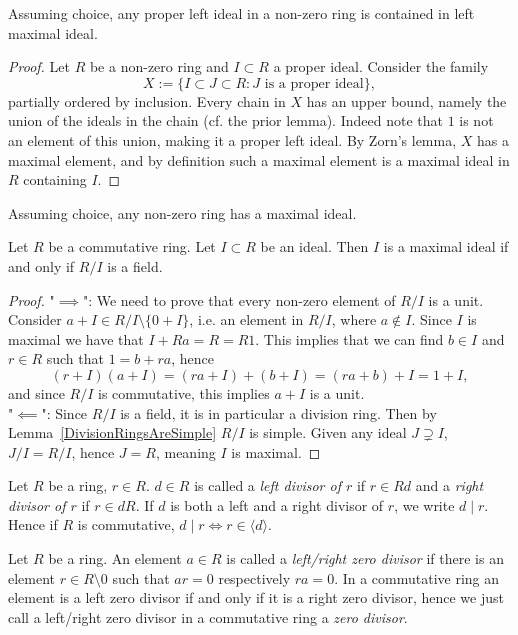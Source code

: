 \begin{proposition}\label{AnyProperIdealIsContainedInMaximalIdeal}
    Assuming choice, any proper left ideal in a non-zero ring is contained in left maximal ideal. 
\end{proposition}
\begin{proof}
    Let $R$ be a non-zero ring and $I\subset R$ a proper ideal. Consider the family 
    $$
        X := \{I\subset J\subset R : J \text{ is a proper ideal}\},
    $$
    partially ordered by inclusion. Every chain in $X$ has an upper bound, namely the union of the ideals in the chain (cf. the prior lemma). Indeed note that $1$ is not an element of this union, making it a proper left ideal. By Zorn's lemma, $X$ has a maximal element, and by definition such a maximal element is a maximal ideal in $R$ containing $I$. 
\end{proof}
\begin{corollary}
    Assuming choice, any non-zero ring has a maximal ideal. 
\end{corollary}
\begin{proposition}\label{InCommutativeRingMaximalIdealIffQuotientRingField}
    Let $R$ be a commutative ring. Let $I\subset R$ be an ideal. Then $I$ is a maximal ideal if and only if $R/I$ is a field.
\end{proposition}
\begin{proof}
    "$\implies$": We need to prove that every non-zero element of $R/I$ is a unit. Consider $a + I \in R/I\setminus \{0+I\}$, i.e. an element in $R/I$, where $a \notin I$. Since $I$ is maximal we have that $I+Ra = R = R1$. This implies that we can find $b\in I$ and $r \in R$ such that $1 = b + ra$, hence
    $$(r+I)(a+I) = (ra + I) + (b+I) = (ra+b)+I = 1 + I,$$
    and since $R/I$ is commutative, this implies $a+I$ is a unit.\\
    "$\impliedby$": Since $R/I$ is a field, it is in particular a division ring. Then by Lemma~\ref{DivisionRingsAreSimple} $R/I$ is simple. Given any ideal $J\supsetneq I$, $J/I=R/I$, hence $J=R$, meaning $I$ is maximal.  
\end{proof}
\begin{definition}
    Let $R$ be a ring, $r\in R$. $d\in R$ is called a \textit{left divisor of $r$} if $r\in Rd$ and a \textit{right divisor of $r$} if $r\in dR$. If $d$ is both a left and a right divisor of $r$, we write $d\mid r$. Hence if $R$ is commutative, $d\mid r \iff r\in \langle d\rangle$.
\end{definition}
\begin{definition}
    Let $R$ be a ring. An element $a\in R$ is called a \textit{left/right zero divisor} if there is an element $r\in R\setminus 0$ such that $ar = 0$ respectively $ra = 0$. In a commutative ring an element is a left zero divisor if and only if it is a right zero divisor, hence we just call a left/right zero divisor in a commutative ring a \textit{zero divisor}.  
\end{definition}
